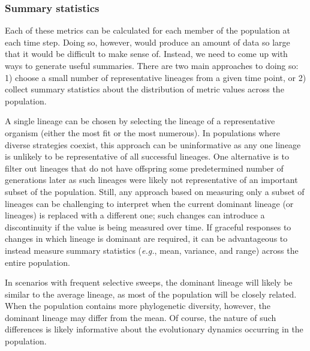 \documentclass[letterpaper]{article}
\begin{document}
\subsubsection{Summary statistics}

Each of these metrics can be calculated for each member of the population at each time step. Doing so, however, would produce an amount of data so large that it would be difficult to make sense of. Instead, we need to come up with ways to generate useful summaries. There are two main approaches to doing so: 1) choose a small number of representative lineages from a given time point, or 2) collect summary statistics about the distribution of metric values across the population.

A single lineage can be chosen by selecting the lineage of a representative organism 
(either the most fit or the most numerous). 
In populations where diverse strategies coexist, this approach can be uninformative as any one lineage is unlikely to be representative of all successful lineages. One alternative is to filter out lineages that do not have offspring some predetermined number of generations later as such lineages were likely not representative of an important subset of the population. Still, any approach based on measuring only a subset of lineages can be challenging to interpret when the current dominant lineage (or lineages) is replaced with a different one; such changes can introduce a discontinuity if the value is being measured over time. If graceful responses to changes in which lineage is dominant are required, it can be advantageous to instead measure summary statistics (\textit{e.g.}, mean, variance, and range) across the entire population. 

In scenarios with frequent selective sweeps, the dominant lineage will likely be similar to the average lineage,
as most of the population will be closely related. When the population contains more phylogenetic diversity, however, %
the dominant lineage may differ from the mean. Of course, the nature of such differences is likely informative about the evolutionary dynamics occurring in the population. 
\end{document}
